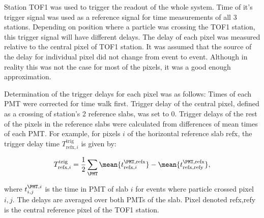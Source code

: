 
Station TOF1 was used to trigger the readout of the whole system. Time
of it's trigger signal was used as a reference signal for time
measurements of all 3 stations. Depending on position where a particle
was crossing the TOF1 station, this trigger signal will have different
delays. The delay of each pixel was measured relative to the central
pixel of TOF1 station. It was assumed that the source of the delay for
individual pixel did not change from event to event. Although in
reality this was not the case for most of the pixels, it was a good
enough approximation.

Determination of the trigger delays for each pixel was as follows:
Times of each PMT were corrected for time walk first. Trigger delay of
the central pixel, defined as a crossing of station's 2 reference
slabs, was set to 0. Trigger delays of the rest of the pixels in the
reference slabs were calculated from differences of mean times of each
PMT. For example, for pixels $i$ of the horizontal reference slab
$\text{refx}$, the trigger delay time $T^\text{trig}_{\text{refx},i}$
is given by:
%
\begin{linenomath}
  \begin{equation}
    \label{eq:trigdel:a}
    T^\text{trig}_{\text{refx},i} =
    \frac12\sum_{\PMT}
    \mean{t^{\PMT, \text{refx}}_{\text{refx},i}} -
    \mean{t^{\PMT,\text{refx}}_{\text{refx},\text{refy}}},
  \end{equation}
\end{linenomath}
%
where $t^{\PMT, i}_{i,j}$ is the time in PMT of slab $i$ for events
where particle crossed pixel $i, j$. The delays are averaged over both
PMTs of the slab. Pixel denoted refx,refy is the central reference
pixel of the TOF1 station.

